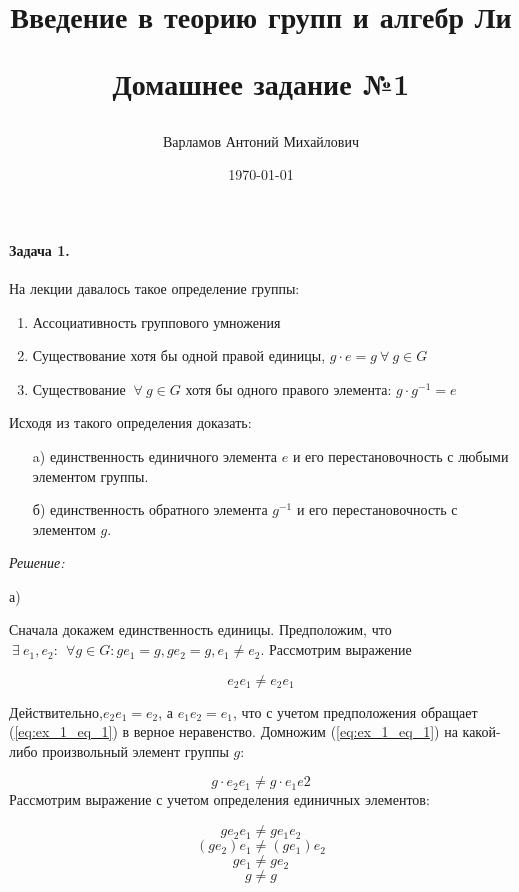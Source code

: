 \documentclass[10pt,a4paper]{article}
\title{Введение в теорию групп и алгебр Ли \\
	\begin{normalsize}
		Домашнее задание №1
	\end{normalsize}}
\date{\today}
\author{Варламов Антоний Михайлович}
\begin{document}
	\maketitle
	
	\paragraph{Задача 1.} На лекции давалось такое определение группы:
	\begin{enumerate}
		\item Ассоциативность группового умножения
		\item Существование хотя бы одной правой единицы,
		$g\cdot e = g \ \forall \ g \in G$
		\item Существование $\ \forall \ g \in G$ хотя бы одного правого 
		элемента: $g\cdot g^{-1} = e$
	\end{enumerate}	
		
		Исходя из такого определения доказать:
		
	\begin{itemize}
		\item[a)] единственность единичного элемента $e$ и его перестановочность
		с любыми элементом группы.
		\item[б)] единственность обратного элемента $g^{-1}$ и его 
		перестановочность  с элементом $g$. 
	\end{itemize}
	
	\textit{Решение:}
	
	а)
	
	Сначала докажем единственность единицы. Предположим, что $\ \exists \ e_{1}, 
	e_{2}: \ \ \forall g \in G: ge_{1} = g, ge_{2} = g, e_{1} \neq e_{2}$. 
	Рассмотрим выражение 
	
	\begin{equation}
		e_{2}e_{1} \neq e_{2}e_{1}\label{eq:ex_1_eq_1}
	\end{equation}
	
	Действительно,$e_{2}e_{1} = e_{2}$, а $e_{1}e_{2} = e_{1}$, что с учетом 
	предположения обращает  (\ref{eq:ex_1_eq_1}) в верное неравенство. Домножим 
	(\ref{eq:ex_1_eq_1}) на какой-либо произвольный элемент группы $g$:

	\begin{equation}
		\label{eq:ex_1_eq_2}	
		g\cdot e_{2}e_{1} \neq g \cdot e_{1}e{2}
	\end{equation}		
	Рассмотрим выражение с учетом определения единичных элементов:
	
	\begin{equation}
		\label{eq:ex_1_eq_3}
		g e_{2}e_{1} \neq g e_{1}e_{2}
	\end{equation}
	\begin{equation}
		\label{eq:ex_1_eq_4}
		\left(g e_{2}\right)e_{1} \neq \left(g e_{1}\right) e_{2}
	\end{equation}
	\begin{equation}
		\label{eq:ex_1_eq_5}
		ge_{1} \neq ge_{2} 
	\end{equation}
	\begin{equation}
		\label{eq:ex_1_eq_6}
		g \neq g
	\end{equation}	
	
\end{document}
